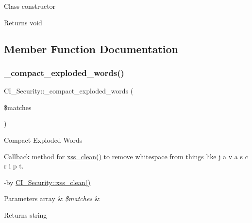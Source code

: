 Class constructor

\begin{DoxyReturn}{Returns}
void 
\end{DoxyReturn}


\subsection{Member Function Documentation}
\mbox{\label{class_c_i___security_ad2dfad96dd004a60c77771c1f0ad4194}} 
\subsubsection{\texorpdfstring{\+\_\+compact\+\_\+exploded\+\_\+words()}{\_compact\_exploded\_words()}}
{\footnotesize\ttfamily C\+I\+\_\+\+Security\+::\+\_\+compact\+\_\+exploded\+\_\+words (\begin{DoxyParamCaption}\item[{}]{\$matches }\end{DoxyParamCaption})\hspace{0.3cm}{\ttfamily [protected]}}

Compact Exploded Words

Callback method for \mbox{\hyperlink{class_c_i___security_a2a5bb2a641bd37cbae73a96ee35dee30}{xss\+\_\+clean()}} to remove whitespace from things like \textquotesingle{}j a v a s c r i p t\textquotesingle{}.

-\/by \mbox{\hyperlink{class_c_i___security_a2a5bb2a641bd37cbae73a96ee35dee30}{C\+I\+\_\+\+Security\+::xss\+\_\+clean()}} 
\begin{DoxyParams}[1]{Parameters}
array & {\em \$matches} & \\
\hline
\end{DoxyParams}
\begin{DoxyReturn}{Returns}
string 
\end{DoxyReturn}
\mbox{\label{class_c_i___security_abe0a6444266cd826927ed138d55a088a}} 
